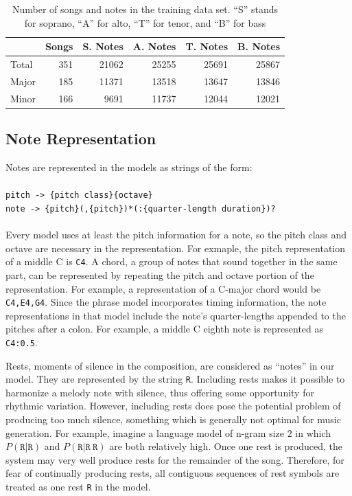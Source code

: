 \documentclass{sig-alternate}
\begin{document}
\begin{table}[h]
  \begin{center}
      \begin{tabular}{| l | r | r | r | r | r |}
      \hline
       \  & Songs & S. Notes & A. Notes & T. Notes & B. Notes \\ \hline
       Total &  351 & 21062 & 25255 & 25691 & 25867 \\ \hline
       Major &  185 & 11371 & 13518 & 13647 & 13846 \\ \hline
       Minor & 166 & 9691 & 11737 & 12044 & 12021  \\ \hline
      \end{tabular}
  \end{center}
  \caption{Number of songs and notes in the training data set. ``S'' stands for soprano, ``A'' for alto, ``T'' for tenor, and ``B'' for bass}
\end{table}

\subsection{Note Representation}
Notes are represented in the models as strings of the form:\\
\\
\texttt{pitch -> \{pitch class\}\{octave\}}\\
\texttt{note -> \{pitch\}(,\{pitch\})*(:\{quarter-length duration\})?}\\
\\
Every model uses at least the pitch information for a note, so the pitch class and octave are necessary in the representation. For exmaple, the pitch representation of a middle C is \texttt{C4}. A chord, a group of notes that sound together in the same part, can be represented by repeating the pitch and octave portion of the representation. For example, a representation of a C-major chord would be \texttt{C4,E4,G4}. Since the phrase model incorporates timing information, the note representations in that model include the note's quarter-lengths appended to the pitches after a colon. For example, a middle C eighth note is represented as \texttt{C4:0.5}.

Rests, moments of silence in the composition, are considered as ``notes'' in our model. They are represented by the string \texttt{R}. Including rests makes it possible to harmonize a melody note with silence, thus offering some opportunity for rhythmic variation. However, including rests does pose the potential problem of producing too much silence, something which is generally not optimal for music generation. For example, imagine a language model of n-gram size $2$ in which $P(\texttt{R} | \texttt{R})$ and $P (\texttt{R} | \texttt{R}\ \texttt{R})$ are both relatively high. Once one rest is produced, the system may very well produce rests for the remainder of the song. Therefore, for fear of continually producing rests, all contiguous sequences of rest symbols are treated as one rest \texttt{R} in the model.
\end{document}
